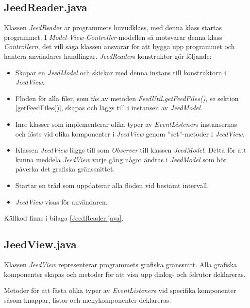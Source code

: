 \documentclass[a4paper, 12pt]{article}
\begin{document}
\subsection{JeedReader.java}\label{JeedReader}
Klassen \textit{JeedReader} är programmets huvudklass, med denna klass
startas programmet. I \textit{Model-View-Controller}-modellen så
motsvarar denna klass \textit{Controllern}, det vill säga klassen
ansvarar för att bygga upp programmet och hantera användares
handlingar. \textit{JeedReader}s konstruktor gör följande:

\begin{itemize}
\item Skapar en \textit{JeedModel} och skickar med denna instans till
  konstruktorn i \textit{JeedView}.

\item Flöden för alla filer, som fås av metoden
  \textit{FeedUtil.getFeedFiles()}, se sektion \ref{getFeedFiles()},
  skapas och läggs till i instansen av \textit{JeedModel}.

\item Inre klasser som implementerar olika typer av
  \textit{EventListener}s instansernas och fästs vid olika komponenter
  i \textit{JeedView} genom ''set''-metoder i \textit{JeedView}.

\item Klassen \textit{JeedView} läggs till som \textit{Observer} till
  klassen \textit{JeedModel}. Detta för att kunna meddela
  \textit{JeedView} varje gång något ändras i \textit{JeedModel} som
  bör påverka det grafiska gränssnittet.

\item Startar en tråd som uppdaterar alla flöden vid bestämt
  intervall.
  
\item \textit{JeedView} visas för användaren.
\end{itemize}

Källkod finns i bilaga \ref{JeedReader.java}.

\subsection{JeedView.java}\label{JeedView}
Klassen \textit{JeedView} representerar programmets grafiska
gränssnitt. Alla grafiska komponenter skapas och metoder för att visa
upp dialog- och felrutor deklareras.

Metoder för att fästa olika typer av \textit{EventListener}s vid
specifika komponenter såsom knappar, listor och menykomponenter
deklareras.
\end{document}
